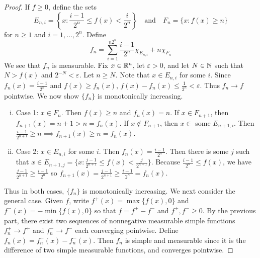 \documentclass[11pt]{article}
\let\eps\varepsilon
\begin{document}
\begin{exercise}{1}
    \begin{proof}
        If $f \ge 0$, define the sets $$E_{n, i} = \left \{ x : \frac{i - 1}{2^n} \le f(x) < \frac{i}{2^n} \right \} \quad \text{and} \quad F_n = \{ x : f(x) \ge n \}$$ for $n \ge  1$ and $i = 1, \dots, 2^n$. Define $$f_n = \sum_{i = 1}^{n2^n} \frac{i - 1}{2^n} \chi_{E_{n, i}} + n \chi_{F_n}$$ We see that $f_n$ is measurable. Fix $x \in \mathbb{R}^n$, let $\eps > 0$, and let $N \in \mathbb{N}$ such that $N > f(x)$ and $2^{-N} < \eps$. Let $n \ge N$. Note that $x \in E_{n, i}$ for some $i$. Since $f_n(x) = \frac{i - 1}{2^n}$ and $f(x) \ge f_n(x)$, $f(x) - f_n(x) \le \frac{1}{2^n} < \eps$. Thus $f_n \to f$ pointwise. We now show $\{ f_n \}$ is monotonically increasing. \begin{enumerate} [(i)]
            \item Case 1: $x \in F_n$. Then $f(x) \ge n$ and $f_n(x) = n$. If $x \in F_{n + 1}$, then $f_{n + 1}(x) = n + 1 > n = f_n(x)$. If $x \notin F_{n + 1}$, then $x \in $ some $E_{n + 1 ,i}$. Then $\frac{i - 1}{2^{n + 1}} \ge n \implies f_{n + 1}(x) \ge n = f_n(x)$.
            \item Case 2: $x \in E_{n, i}$ for some $i$. Then $f_n(x) = \frac{i - 1}{2^n}$. Then there is some $j$ such that $x \in E_{n + 1, j} = \{ x : \frac{j - 1}{2^{n + 1}} \le f(x) < \frac{j}{2^{n+1}} \}$. Because $\frac{i - 1}{2^n} \le f(x)$, we have $\frac{j - 1}{2^{n+1}} \ge \frac{i - 1}{2^n}$ so $f_{n+1}(x) = \frac{j - 1}{2^{n+1}} \ge \frac{i - 1}{2^n} = f_n(x)$. 
        \end{enumerate}
        Thus in both cases, $\{ f_n \}$  is monotonically increasing. We next consider the general case. Given $f$, write $f^+(x) = \max \{ f(x), 0 \}$ and $f^-(x) = - \min \{ f(x), 0 \}$ so that $f = f^+ - f^-$ and $f^+, f^- \ge 0$. By the previous part, there exist two sequences of nonnegative measurable simple functions $f_n^+ \to f^+$ and $f_n^- \to f^-$ each converging pointwise. Define $f_n(x) = f_n^+(x) - f_n^-(x)$. Then $f_n$ is simple and measurable since it is the difference of two simple measurable functions, and converges pointwise. 
    \end{proof}
\end{exercise}
\end{document}
